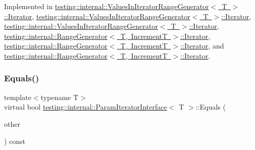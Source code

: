Implemented in \mbox{\hyperlink{classtesting_1_1internal_1_1_values_in_iterator_range_generator_1_1_iterator_a75604bc318aca22ff8607b68bfb44e96}{testing\+::internal\+::\+Values\+In\+Iterator\+Range\+Generator$<$ T $>$\+::\+Iterator}}, \mbox{\hyperlink{classtesting_1_1internal_1_1_values_in_iterator_range_generator_1_1_iterator_a75604bc318aca22ff8607b68bfb44e96}{testing\+::internal\+::\+Values\+In\+Iterator\+Range\+Generator$<$ T $>$\+::\+Iterator}}, \mbox{\hyperlink{classtesting_1_1internal_1_1_values_in_iterator_range_generator_1_1_iterator_aff9f8c1c01a4e708235d8793b2c44d31}{testing\+::internal\+::\+Values\+In\+Iterator\+Range\+Generator$<$ T $>$\+::\+Iterator}}, \mbox{\hyperlink{classtesting_1_1internal_1_1_range_generator_1_1_iterator_a534406abbddb137d7672c2b53d5bff0b}{testing\+::internal\+::\+Range\+Generator$<$ T, Increment\+T $>$\+::\+Iterator}}, \mbox{\hyperlink{classtesting_1_1internal_1_1_range_generator_1_1_iterator_a534406abbddb137d7672c2b53d5bff0b}{testing\+::internal\+::\+Range\+Generator$<$ T, Increment\+T $>$\+::\+Iterator}}, and \mbox{\hyperlink{classtesting_1_1internal_1_1_range_generator_1_1_iterator_a2ae0f453be98bdcfffecc3c71c7a9879}{testing\+::internal\+::\+Range\+Generator$<$ T, Increment\+T $>$\+::\+Iterator}}.

\mbox{\label{classtesting_1_1internal_1_1_param_iterator_interface_a9d811697a752d46f7bd6a0082f9040a3}} 
\subsubsection{\texorpdfstring{Equals()}{Equals()}\hspace{0.1cm}{\footnotesize\ttfamily [3/3]}}
{\footnotesize\ttfamily template$<$typename T$>$ \\
virtual bool \mbox{\hyperlink{classtesting_1_1internal_1_1_param_iterator_interface}{testing\+::internal\+::\+Param\+Iterator\+Interface}}$<$ T $>$\+::Equals (\begin{DoxyParamCaption}\item[{const \mbox{\hyperlink{classtesting_1_1internal_1_1_param_iterator_interface}{Param\+Iterator\+Interface}}$<$ T $>$ \&}]{other }\end{DoxyParamCaption}) const\hspace{0.3cm}{\ttfamily [pure virtual]}}



